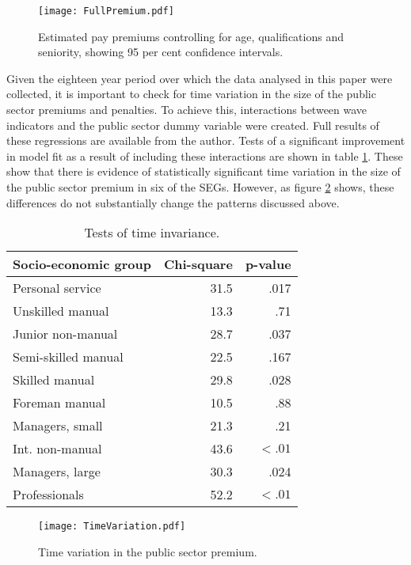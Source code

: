 \documentclass[a4paper,11pt,titlepage]{article}
\begin{document}
\begin{figure}
    \texttt{[image: FullPremium.pdf]}
    \caption{Estimated pay premiums controlling for age, qualifications and seniority,
    showing 95 per cent confidence intervals.\label{fig:full}}
\end{figure}

Given the eighteen year period over which the data analysed in this paper were collected, it is important to check for time variation in the size of the public sector premiums and penalties.  To achieve this, interactions between wave indicators and the public sector dummy variable were created.  Full results of these regressions are available from the author.  Tests of a significant improvement in model fit as a result of including these interactions are shown in table \ref{tab:time}.  These show that there is evidence of statistically significant time variation in the size of the public sector premium in six of the SEGs.  However, as figure \ref{fig:time} shows, these differences do not substantially change the patterns discussed above.

\begin{table}[ht]
    \caption{Tests of time invariance. \label{tab:time}}
    \begin{center}
    \begin{tabular}{lrr}
    \toprule
    Socio-economic group & Chi-square & p-value \\
    \midrule
    Personal service & 31.5 & .017 \\
    Unskilled manual & 13.3 & .71 \\
    Junior non-manual & 28.7 & .037 \\
    Semi-skilled manual & 22.5 & .167 \\
    Skilled manual & 29.8 & .028 \\
    Foreman manual & 10.5 & .88 \\
    Managers, small & 21.3 & .21 \\
    Int. non-manual & 43.6 & $ < .01 $\\
    Managers, large&30.3 & .024 \\
    Professionals & 52.2 & $< .01$ \\
    \bottomrule
    \end{tabular}
    \end{center}
\end{table}

\begin{figure}[ht]
    \texttt{[image: TimeVariation.pdf]}
    \caption{Time variation in the public sector premium. \label{fig:time}}
\end{figure}
\end{document}
